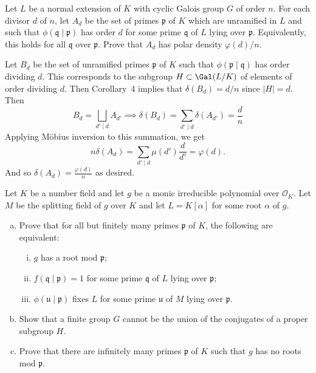 \documentclass[11pt,letterpaper]{article}
\begin{document}
\begin{cproblem}{7.10}
    Let $L$ be a normal extension of $K$ with cyclic Galois group $G$ of order $n$. For each divisor $d$ of $n$, let $A_d$ be the set of primes $\mathfrak{p}$ of $K$ which are unramified in $L$ and such that $\phi(\mathfrak{q}\mid \mathfrak{p})$ has order $d$ for some prime $\mathfrak{q}$ of $L$ lying over $\mathfrak{p}$. Equivalently, this holds for all $\mathfrak{q}$ over $\mathfrak{p}$. Prove that $A_d$ has polar density $\varphi(d)/n$.
\end{cproblem}

\begin{solution}
    Let $B_d$ be the set of unramified primes $\mathfrak{p}$ of $K$ such that $\phi(\mathfrak{p}\mid\mathfrak{q})$ has order dividing $d$. This corresponds to the subgroup $H\subset \Gal(L/K)$ of elements of order dividing $d$. Then Corollary~4 implies that $\delta(B_d)=d/n$ since $|H|=d$. Then 
    \[
        B_d=\bigsqcup_{d'\mid d} A_{d'} \implies \delta(B_d) = \sum_{d'\mid d}\delta(A_{d'}) = \frac{d}{n}
    \] 
    Applying M\"obius inversion to this summation, we get
    \[
        n\delta(A_d)=\sum_{d'\mid d} \mu(d')\frac{d}{d'} = \varphi(d).
    \] 
    And so $\delta(A_d)=\frac{\varphi(d)}{n}$ as desired.
\end{solution}

\begin{cproblem}{7.13}
    Let $K$ be a number field and let $g$ be a monic irreducible polynomial over $\mathcal{O}_K$. Let $M$ be the splitting field of $g$ over $K$ and let $L=K[\alpha]$ for some root $\alpha$ of $g$.
    \begin{enumerate}[(a)]
        \item Prove that for all but finitely many primes $\mathfrak{p}$ of $K$, the following are equivalent:
            \begin{enumerate}[(i)]
                \item $g$ has a root mod $ \mathfrak{p}$;
                \item $f(\mathfrak{q}\mid \mathfrak{p})=1$ for some prime $\mathfrak{q}$ of $L$ lying over $\mathfrak{p}$;
                \item $\phi(\mathfrak{u}\mid \mathfrak{p})$ fixes $L$ for some prime $ \mathfrak{u}$ of $M$ lying over $\mathfrak{p}$. %
            \end{enumerate}
        \item Show that a finite group $G$ cannot be the union of the conjugates of a proper subgroup $H$. %
        \item Prove that there are infinitely many primes $\mathfrak{p}$ of $K$ such that $g$ has no roots mod $\mathfrak{p}$. %
    \end{enumerate}
\end{cproblem}
\end{document}
